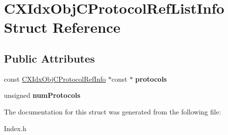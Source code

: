 \hypertarget{structCXIdxObjCProtocolRefListInfo}{}\section{C\+X\+Idx\+Obj\+C\+Protocol\+Ref\+List\+Info Struct Reference}
\label{structCXIdxObjCProtocolRefListInfo}
\subsection*{Public Attributes}
\begin{DoxyCompactItemize}
\item 
\mbox{\label{structCXIdxObjCProtocolRefListInfo_acb9f5514262e6520e041e0ce52ee3a42}} 
const \mbox{\hyperlink{structCXIdxObjCProtocolRefInfo}{C\+X\+Idx\+Obj\+C\+Protocol\+Ref\+Info}} $\ast$const  $\ast$ {\bfseries protocols}
\item 
\mbox{\label{structCXIdxObjCProtocolRefListInfo_a794c3a04408408651a8f8dd99cd2282b}} 
unsigned {\bfseries num\+Protocols}
\end{DoxyCompactItemize}


The documentation for this struct was generated from the following file\+:\begin{DoxyCompactItemize}
\item 
Index.\+h\end{DoxyCompactItemize}

